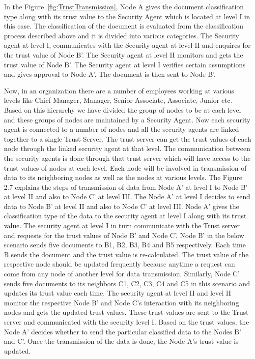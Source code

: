 In the Figure~\ref{fig:TrustTransmission}, Node A gives the document classification type along with its trust value
to the Security Agent which is located at level I in this case. The classification of the document
is evaluated from the classification process described above and it is divided into various
categories. The Security agent at level I, communicates with the Security agent at level II and
enquires for the trust value of Node B'. The Security agent at level II monitors and gets the trust
value of Node B'. The Security agent at level I verifies certain assumptions and gives approval to
Node A'. The document is then sent to Node B'.

Now, in an organization there are a number of employees working at various levels like
Chief Manager, Manager, Senior Associate, Associate, Junior etc. Based on this hierarchy we
have divided the group of nodes to be at each level and these groups of nodes are maintained
by a Security Agent. Now each security agent is connected to a number of nodes and all
the security agents are linked together to a single Trust Server. The trust server can get the
trust values of each node through the linked security agent at that level. The communication
between the security agents is done through that trust server which will have access to the
trust values of nodes at each level. Each node will be involved in transmission of data to its
neighboring nodes as well as the nodes at various levels. The Figure 2.7 explains the steps of
transmission of data from Node A' at level I to Node B' at level II and also to Node C' at level
III. The Node A' at level I decides to send data to Node B' at level II and also to Node C' at level
III. Node A' gives the classification type of the data to the security agent at level I along with
its trust value. The security agent at level I in turn communicate with the Trust server and
requests for the trust values of Node B' and Node C'. Node B' in the below scenario sends five
documents to B1, B2, B3, B4 and B5 respectively. Each time B sends the document and the trust
value is re-calculated. The trust value of the respective node should be updated frequently
because anytime a request can come from any node of another level for data transmission.
Similarly, Node C' sends five documents to its neighbors C1, C2, C3, C4 and C5 in this scenario
and updates its trust value each time. The security agent at level II and level II monitor the
respective Node B' and Node C's interaction with its neighboring nodes and gets the updated
trust values. These trust values are sent to the Trust server and communicated with the security
level I. Based on the trust values, the Node A' decides whether to send the particular classified
data to the Nodes B' and C'. Once the transmission of the data is done, the Node A's trust value
is updated.


